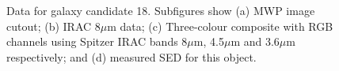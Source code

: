 \documentclass[times,usenatbib]{mn2e}
\begin{document}
\begin{figure}
\begin{center}
\caption{Data for galaxy candidate 18. Subfigures show (a) MWP image cutout; (b) IRAC 8$\mu$m data; (c) Three-colour composite with RGB channels using Spitzer IRAC bands 8$\mu$m, 4.5$\mu$m and 3.6$\mu$m respectively; and (d) measured SED for this object.}
\label{gal18}
\end{center}
\end{figure} 
\end{document}
